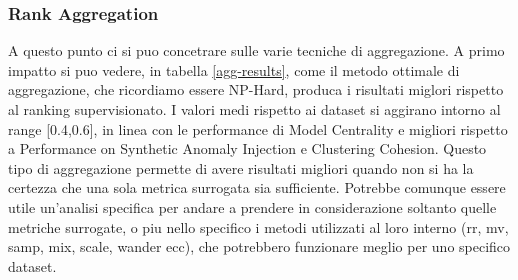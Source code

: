 \newpage
\subsubsection{Rank Aggregation}
A questo punto ci si puo concetrare sulle varie tecniche di aggregazione. A primo impatto si puo vedere, in tabella \ref{agg-results}, come il metodo ottimale di aggregazione, che ricordiamo essere NP-Hard, produca i risultati miglori rispetto al ranking supervisionato. 
I valori medi rispetto ai dataset si aggirano intorno al range [0.4,0.6], in linea con le performance di Model Centrality e migliori rispetto a Performance on Synthetic Anomaly Injection e Clustering Cohesion.
Questo tipo di aggregazione permette di avere risultati migliori quando non si ha la certezza che una sola metrica surrogata sia sufficiente. Potrebbe comunque essere utile un'analisi specifica per andare a prendere in considerazione soltanto quelle metriche surrogate, o piu nello specifico i metodi utilizzati al loro interno (rr, mv, samp, mix, scale, wander ecc), che potrebbero funzionare meglio per uno specifico dataset. 

